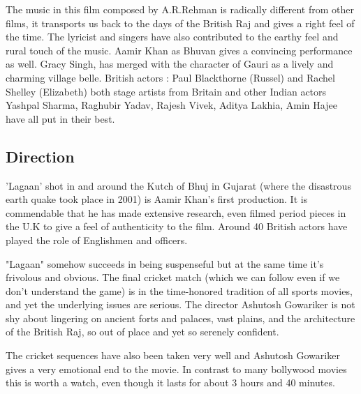 \documentclass[a4paper]{article}
\begin{document}
The music in this film composed by A.R.Rehman is radically different from other films, it transports us back to the days of the British Raj and gives a right feel of the time. The lyricist and singers have also contributed to the earthy feel and rural touch of the music. Aamir Khan as Bhuvan gives a convincing performance as well. Gracy Singh, has merged with the character of Gauri as a lively and charming village belle. British actors : Paul Blackthorne (Russel) and Rachel Shelley (Elizabeth) both stage artists from Britain and other Indian actors Yashpal Sharma, Raghubir Yadav, Rajesh Vivek, Aditya Lakhia, Amin Hajee have all put in their best.


\subsection{Direction}
'Lagaan' shot in and around the Kutch of Bhuj in Gujarat (where the disastrous earth quake took place in 2001) is Aamir Khan's first production. It is commendable that he has made extensive research, even filmed period pieces in the U.K to give a feel of authenticity to the film. Around 40 British actors have played the role of Englishmen and officers.

"Lagaan" somehow succeeds in being suspenseful but at the same time it's frivolous and obvious. The final cricket match (which we can follow even if we don't understand the game) is in the time-honored tradition of all sports movies, and yet the underlying issues are serious. The director Ashutosh Gowariker is not shy about lingering on ancient forts and palaces, vast plains, and the architecture of the British Raj, so out of place and yet so serenely confident.

The cricket sequences have also been taken very well and Ashutosh Gowariker gives a very emotional end to the movie. In contrast to many bollywood movies this is worth a watch, even though it lasts for about 3 hours and 40 minutes.
	  
	  
	  


	    	        
	        
	            
	        
	     
	    
	

	
	
\end{document}
